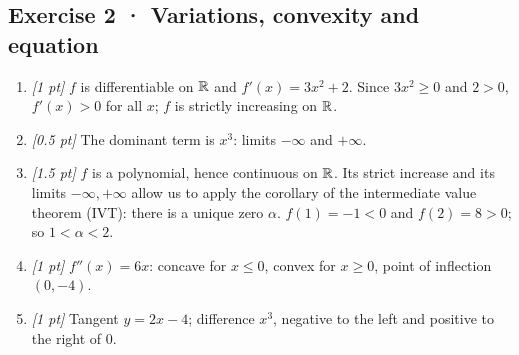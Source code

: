 \subsection*{Exercise 2 · Variations, convexity and equation}\begin{enumerate}

\item \textit{[1 pt]} $f$ is differentiable on $\mathbb R$ and $f'(x)=3x^2+2$. Since $3x^2\ge0$ and $2>0$, $f'(x)>0$ for all $x$; $f$ is strictly increasing on $\mathbb R$.

\item \textit{[0.5 pt]} The dominant term is $x^3$: limits $-\infty$ and $+\infty$.

\item \textit{[1.5 pt]} $f$ is a polynomial, hence continuous on $\mathbb R$. Its strict increase and its limits $-\infty,+\infty$ allow us to apply the corollary of the intermediate value theorem (IVT): there is a unique zero $\alpha$. $f(1)=-1<0$ and $f(2)=8>0$; so $1<\alpha<2$.

\item \textit{[1 pt]} $f''(x)=6x$: concave for $x\le0$, convex for $x\ge0$, point of inflection $(0,-4)$.

\item \textit{[1 pt]} Tangent $y=2x-4$; difference $x^3$, negative to the left and positive to the right of $0$.

\end{enumerate}

